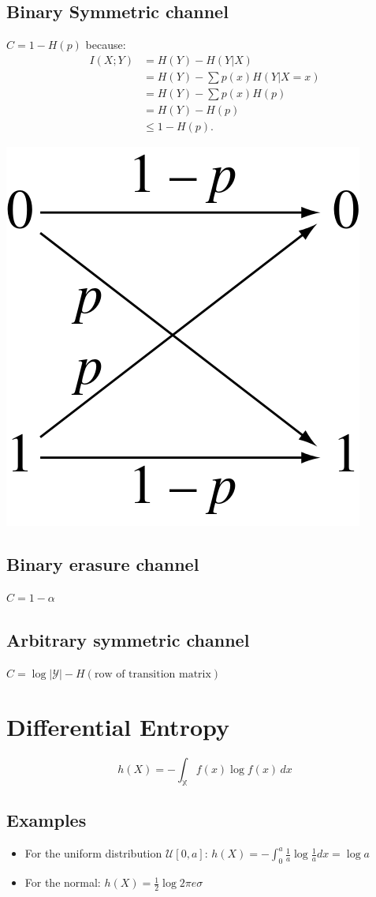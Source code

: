\documentclass[10pt,a4paper,landscape]{article}
\begin{document}
\begin{multicols*}{4}
\subsection{Binary Symmetric channel}
$C = 1 - H(p)$ because:
\begin{align}
	I(X; Y) &= H(Y) - H(Y | X)\\
			&= H(Y) - \sum p(x) H(Y| X = x)\\
			&= H(Y) - \sum p(x) H(p)\\
			&= H(Y) - H(p)\\
			&\leq 1 - H(p).
\end{align}
\begin{colfig}
	\centering
	\includegraphics[width=0.6\linewidth]{binary-symmetric-channel.png}
\end{colfig}

\subsection{Binary erasure channel}
$C = 1 - \alpha$

\subsection{Arbitrary symmetric channel}
$C = \log | \mathcal{Y} | - H(\text{row of transition matrix})$

\section{Differential Entropy}
$$h(X) = -\int_\mathbb{X} f(x)\log f(x)\,dx$$

\subsection{Examples}
\begin{itemize}
	\item For the uniform distribution $\mathcal{U}[0, a]$:
	$h(X) = - \int_0^a \frac{1}{a} \log \frac{1}{a} dx = \log a$
	\item For the normal:
	$h(X) = \frac{1}{2} \log 2 \pi e \sigma$
\end{itemize}



\end{multicols*}
\end{document}
